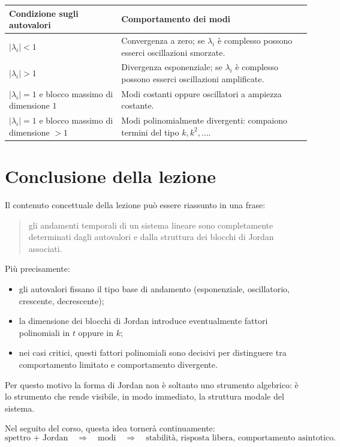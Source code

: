 \begin{center}
\renewcommand{\arraystretch}{1.4}
\begin{tabular}{>{\raggedright\arraybackslash}p{4.2cm} >{\raggedright\arraybackslash}p{9.5cm}}
\toprule
Condizione sugli autovalori & Comportamento dei modi \\
\midrule
$|\lambda_i|<1$ &
Convergenza a zero; se $\lambda_i$ è complesso possono esserci oscillazioni smorzate. \\
\addlinespace
$|\lambda_i|>1$ &
Divergenza esponenziale; se $\lambda_i$ è complesso possono esserci oscillazioni amplificate. \\
\addlinespace
$|\lambda_i|=1$ e blocco massimo di dimensione $1$ &
Modi costanti oppure oscillatori a ampiezza costante. \\
\addlinespace
$|\lambda_i|=1$ e blocco massimo di dimensione $>1$ &
Modi polinomialmente divergenti: compaiono termini del tipo $k, k^2, \dots$. \\
\bottomrule
\end{tabular}
\end{center}

\section{Conclusione della lezione}

Il contenuto concettuale della lezione può essere riassunto in una frase:

\begin{quote}
gli andamenti temporali di un sistema lineare sono completamente determinati dagli autovalori e dalla struttura dei blocchi di Jordan associati.
\end{quote}

Più precisamente:
\begin{itemize}
    \item gli autovalori fissano il tipo base di andamento (esponenziale, oscillatorio, crescente, decrescente);
    \item la dimensione dei blocchi di Jordan introduce eventualmente fattori polinomiali in $t$ oppure in $k$;
    \item nei casi critici, questi fattori polinomiali sono decisivi per distinguere tra comportamento limitato e comportamento divergente.
\end{itemize}

Per questo motivo la forma di Jordan non è soltanto uno strumento algebrico: è lo strumento che rende visibile, in modo immediato, la struttura modale del sistema.

\vspace{0.5cm}

Nel seguito del corso, questa idea tornerà continuamente:
\[
\text{spettro + Jordan}
\quad \Longrightarrow \quad
\text{modi}
\quad \Longrightarrow \quad
\text{stabilità, risposta libera, comportamento asintotico}.
\]